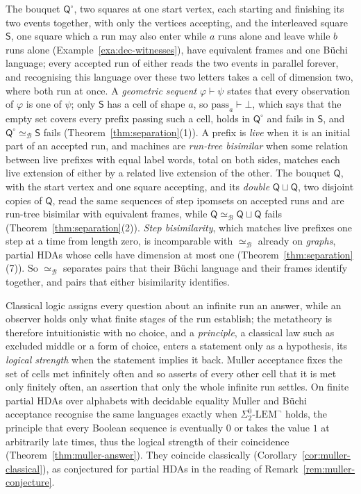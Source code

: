 \documentclass{lmcs}
\theoremstyle{definition}
\theoremstyle{remark}
\newcommand{\prin}[1]{\mathrm{#1}}
\newcommand{\EIO}{\Sigma^0_2\text{-}\prin{LEM}^{\neg}}
\providecommand{\dsum}{\sqcup}
\providecommand{\wQ}{\mathsf{Q}}
\providecommand{\eqB}{\simeq_{\mathcal{B}}}
\providecommand{\dsum}{\sqcup}
\providecommand{\wQ}{\mathsf{Q}}
\begin{document}
The bouquet $\wQ^\circ$, two squares at one start vertex, each starting and finishing its two events together, with
only the vertices accepting, and the interleaved square $\mathsf S$, one square which a run may also enter while $a$
runs alone and leave while $b$ runs alone (Example~\ref{exa:dec-witnesses}), have equivalent frames and one B\"uchi language; every accepted run of either reads the two events in parallel
forever, and recognising this language over these two letters takes a cell of dimension two, where both run at once. A \emph{geometric sequent} $\varphi\vdash\psi$
states that every observation of $\varphi$ is one of $\psi$; only $\mathsf S$ has a cell of shape $a$, so
$\mathrm{pass}_a\vdash\bot$, which says that the empty set covers every prefix passing such a cell, holds in
$\wQ^\circ$ and fails in $\mathsf S$, and $\wQ^\circ\eqB\mathsf S$ fails (Theorem~\ref{thm:separation}(1)). A prefix
is \emph{live} when it is an initial part of an accepted run, and machines are \emph{run-tree bisimilar} when some
relation between live prefixes with equal label words, total on both sides, matches each live extension of either by a
related live extension of the other. The bouquet $\wQ$, with the start vertex and one square accepting, and its
\emph{double} $\wQ\dsum\wQ$, two disjoint copies of $\wQ$, read the same sequences of step ipomsets on accepted runs
and are run-tree bisimilar with equivalent frames, while $\wQ\eqB\wQ\dsum\wQ$ fails (Theorem~\ref{thm:separation}(2)).
\emph{Step bisimilarity}, which matches live prefixes one step at a time from length zero, is incomparable with $\eqB$
already on \emph{graphs}, partial HDAs whose cells have dimension at most one (Theorem~\ref{thm:separation}(7)). So $\eqB$ separates pairs that their B\"uchi language and their
frames identify together, and pairs that either bisimilarity identifies.

Classical logic assigns every question about an infinite run an answer, while an observer holds only what finite
stages of the run establish; the metatheory is therefore intuitionistic with no choice, and a \emph{principle}, a classical law such as excluded middle or a form of choice, enters a statement only as a hypothesis, its
\emph{logical strength} when the statement implies it back. Muller acceptance fixes the set of cells met infinitely
often and so asserts of every other cell that it is met only finitely often, an assertion that only the whole infinite run settles. On
finite partial HDAs over alphabets with decidable equality Muller and B\"uchi acceptance recognise the same languages
exactly when $\EIO$ holds, the principle that every Boolean sequence is eventually $0$ or takes the value $1$ at
arbitrarily late times, thus the logical strength of their coincidence (Theorem~\ref{thm:muller-answer}). They
coincide classically (Corollary~\ref{cor:muller-classical}), as conjectured for partial HDAs in the reading of
Remark~\ref{rem:muller-conjecture}.
\end{document}
